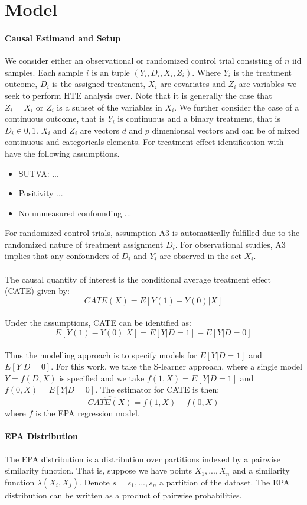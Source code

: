 \documentclass{article}
\begin{document}
\section{Model}
\label{sec:Model}
\paragraph{Causal Estimand and Setup} We consider either an observational or randomized control trial consisting of $n$ iid samples. Each sample $i$ is an tuple $(Y_i, D_i, X_i, Z_i)$. Where $Y_i$ is the treatment outcome, $D_i$ is the assigned treatment, $X_i$ are covariates and $Z_i$ are variables we seek to perform HTE analysis over. Note that it is generally the case that $Z_i = X_i$ or $Z_i$ is a subset of the variables in $X_i$. We further consider the case of a continuous outcome, that is $Y_i$ is continuous and a binary treatment, that is $D_i \in {0,1}$. $X_i$ and $Z_i$ are vectors $d$ and $p$ dimenionsal vectors and can be of mixed continuous and categoricals elements. For treatment effect identification with have the following assumptions.
\begin{itemize}
    \item SUTVA: ...
    \item Positivity ... 
    \item No unmeasured confounding ...
\end{itemize}
For randomized control trials, assumption A3 is automatically fulfilled due to the randomized nature of treatment assignment $D_i$. For observational studies, A3 implies that any confounders of $D_i$ and $Y_i$ are observed in the set $X_i$. 
\\ \\
The causal quantity of interest is the conditional average treatment effect (CATE) given by:
$$CATE(X) = E[Y(1)-Y(0)|X]$$ 
\\ 
Under the assumptions, CATE can be identified as:
$$E[Y(1)-Y(0)|X] = E[Y|D=1] - E[Y|D=0]$$ 
\\ 
Thus the modelling approach is to specify models for $E[Y|D=1]$ and $E[Y|D=0]$. For this work, we take the S-learner approach, where a single model $Y=f(D,X)$ is specified and we take $f(1,X) = E[Y|D=1]$ and $f(0,X) = E[Y|D=0]$. The estimator for CATE is then:
$$\hat{CATE(X)} = f(1,X) - f(0,X)$$ 
where $f$ is the EPA regression model.

\paragraph{EPA Distribution}
The EPA distribution is a distribution over partitions indexed by a pairwise similarity function. That is, suppose we have points $X_1,...,X_n$ and a similarity function $\lambda(X_i,X_j)$. Denote $s={s_1,...,s_n}$ a partition of the dataset. The EPA distribution can be written as a product of pairwise probabilities. 
\end{document}
